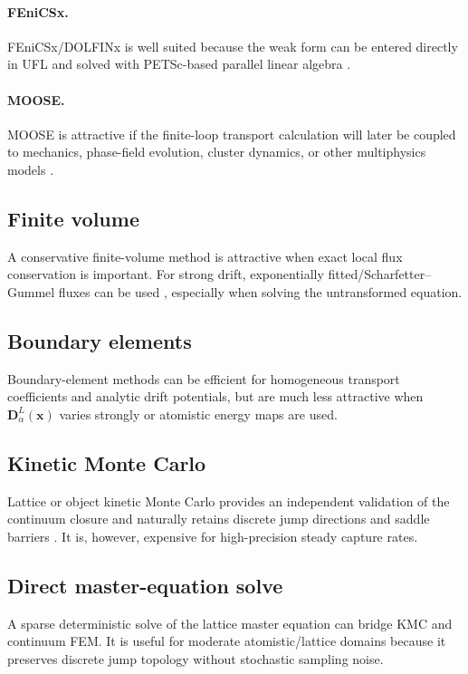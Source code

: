 \documentclass[11pt]{article}
\newcommand{\bD}{\bm{D}}
\newcommand{\bx}{\bm{x}}
\begin{document}
\paragraph{FEniCSx.} FEniCSx/DOLFINx is well suited because the weak form can be entered directly in UFL and solved with PETSc-based parallel linear algebra \cite{BarattaFEniCSx,AlnaesUFL}.

\paragraph{MOOSE.} MOOSE is attractive if the finite-loop transport calculation will later be coupled to mechanics, phase-field evolution, cluster dynamics, or other multiphysics models \cite{GastonMOOSE,PermannMOOSE}.

\subsection{Finite volume}
A conservative finite-volume method is attractive when exact local flux conservation is important. For strong drift, exponentially fitted/Scharfetter--Gummel fluxes can be used \cite{ScharfetterGummel}, especially when solving the untransformed equation.

\subsection{Boundary elements}
Boundary-element methods can be efficient for homogeneous transport coefficients and analytic drift potentials, but are much less attractive when $\bD_\alpha^L(\bx)$ varies strongly or atomistic energy maps are used.

\subsection{Kinetic Monte Carlo}
Lattice or object kinetic Monte Carlo provides an independent validation of the continuum closure and naturally retains discrete jump directions and saddle barriers \cite{MalerbaBecquartDomain2007}. It is, however, expensive for high-precision steady capture rates.

\subsection{Direct master-equation solve}
A sparse deterministic solve of the lattice master equation can bridge KMC and continuum FEM. It is useful for moderate atomistic/lattice domains because it preserves discrete jump topology without stochastic sampling noise.
\end{document}
